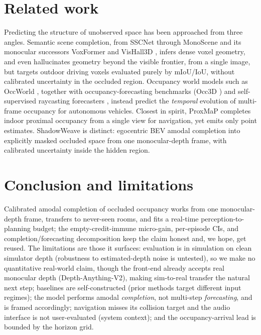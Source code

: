 \documentclass{article}
\begin{document}
\section{Related work}
\label{sec:related}

Predicting the structure of unobserved space has been approached from three angles. Semantic scene
completion, from SSCNet \citep{song2017sscnet} through MonoScene \citep{cao2022monoscene} and its
monocular successors VoxFormer \citep{li2023voxformer} and VisHall3D \citep{lu2025vishall3d},
infers dense voxel geometry, and even hallucinates geometry beyond the visible frontier, from a
single image, but targets outdoor driving voxels evaluated purely by mIoU/IoU, without calibrated
uncertainty in the occluded region. Occupancy world models such as OccWorld \citep{zheng2024occworld}, together with occupancy-forecasting
benchmarks (Occ3D \citep{tian2023occ3d}) and self-supervised raycasting forecasters
\citep{khurana2023pointcloud}, instead predict the \emph{temporal} evolution of multi-frame occupancy for autonomous vehicles.
Closest in spirit, ProxMaP \citep{sharma2023proxmap} completes indoor proximal occupancy from a single
view for navigation, yet emits only point estimates. ShadowWeave is distinct: egocentric BEV amodal
completion into explicitly masked occluded space from one monocular-depth frame, with calibrated
uncertainty inside the hidden region.

\section{Conclusion and limitations}
\label{sec:conclusion}

Calibrated amodal completion of occluded occupancy works from one monocular-depth frame,
transfers to never-seen rooms, and fits a real-time perception-to-planning budget; the
empty-credit-immune micro-gain, per-episode CIs, and completion/forecasting decomposition keep
the claim honest and, we hope, get reused. The limitations are those it surfaces:
evaluation is in simulation on clean simulator depth (robustness to estimated-depth noise is
untested), so we make no quantitative real-world claim, though the front-end
already accepts real monocular depth (Depth-Anything-V2), making sim-to-real transfer the
natural next step; baselines are self-constructed (prior methods target different input
regimes); the model performs amodal
\emph{completion}, not multi-step \emph{forecasting}, and is framed accordingly; navigation
misses its collision target and the audio interface is not user-evaluated (system context); and
the occupancy-arrival lead is bounded by the horizon grid.

\renewcommand{\bibfont}{\small}


\end{document}
